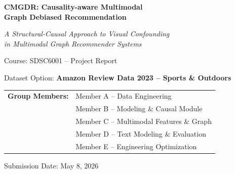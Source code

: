 \documentclass[12pt,a4paper]{article}
\begin{document}
\begin{titlepage}
\centering
\vspace*{2.5cm}

{\Huge\bfseries CMGDR: Causality-aware Multimodal\\[2pt]
Graph Debiased Recommendation\par}

\vspace{0.6cm}
{\large\itshape A Structural-Causal Approach to Visual Confounding\\
in Multimodal Graph Recommender Systems\par}

\vspace{2.5cm}
{\large Course: SDSC6001 -- Project Report\par}

\vspace{1.0cm}
{\large Dataset Option: \textbf{Amazon Review Data 2023 -- Sports \& Outdoors}\par}

\vfill
\begin{tabular}{r l}
\textbf{Group Members:} & Member A -- Data Engineering\\
                        & Member B -- Modeling \& Causal Module\\
                        & Member C -- Multimodal Features \& Graph\\
                        & Member D -- Text Modeling \& Evaluation\\
                        & Member E -- Engineering Optimization\\
\end{tabular}

\vspace{1.5cm}
{\large Submission Date: May 8, 2026\par}
\end{titlepage}

\setcounter{page}{1}

\end{document}
